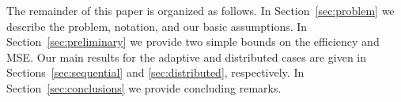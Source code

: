 The remainder of this paper is organized as follows. In
Section~\ref{sec:problem} we describe the problem, notation, and
our basic assumptions. In
Section~\ref{sec:preliminary} we provide two simple bounds on the efficiency
and MSE. Our main results for the adaptive and distributed cases are given
in Sections~\ref{sec:sequential} and \ref{sec:distributed}, respectively. In
Section~\ref{sec:conclusions} we provide concluding remarks.
